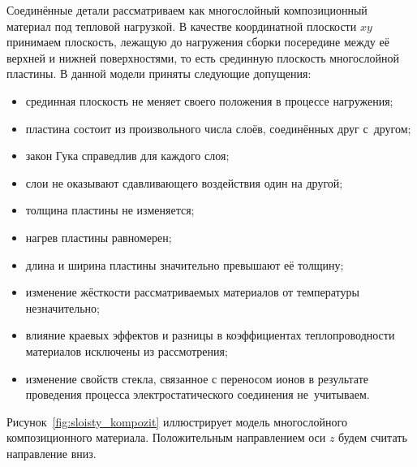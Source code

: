 Соединённые детали рассматриваем как многослойный композиционный материал
под тепловой нагрузкой.
В качестве координатной плоскости $xy$ принимаем плоскость,
лежащую до нагружения сборки посередине между её верхней и нижней поверхностями, то есть срединную
плоскость многослойной пластины.
В данной модели приняты следующие допущения:
\begin{itemize}
    \item срединная плоскость не меняет своего положения в процессе нагружения;
    \item пластина состоит из произвольного числа слоёв, соединённых друг с~другом;
    \item закон Гука справедлив для каждого слоя;
    \item слои не оказывают сдавливающего воздействия один на другой;
    \item толщина пластины не изменяется;
    \item нагрев пластины равномерен;
    \item длина и ширина пластины значительно превышают её толщину;
    \item изменение жёсткости рассматриваемых материалов от температуры незначительно;
    \item влияние краевых эффектов и разницы в коэффициентах теплопроводности
    материалов исключены из рассмотрения;
    \item изменение свойств стекла, связанное с переносом ионов в
    результате проведения процесса электростатического соединения
    \cite{Rogers1992considerations, Cozma_Puers_1995, Sadaba2006CompositionalGradients} не~учитываем.
\end{itemize}

Рисунок~\ref{fig:sloisty_kompozit} иллюстрирует модель многослойного композиционного материала.
Положительным направлением оси $z$ будем считать направление вниз.

